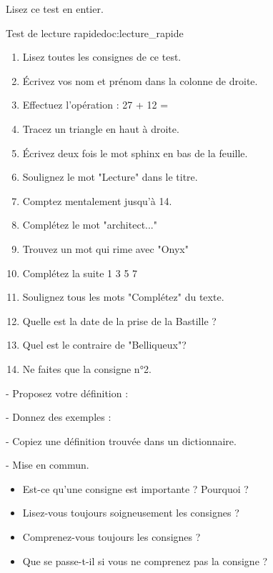 \vAligne{-60pt}

\numeroQuestion Lisez ce test en entier.

\begin{doc}{Test de lecture rapide}{doc:lecture_rapide}
  \begin{enumerate}
    \item Lisez toutes les consignes de ce test.
    \item Écrivez vos nom et prénom dans la colonne de droite.
    \item Effectuez l'opération : 27 + 12 =
    \item Tracez un triangle en haut à droite.
    \item Écrivez deux fois le mot sphinx en bas de la feuille.
    \item Soulignez le mot "Lecture" dans le titre.
    \item Comptez mentalement jusqu'à 14.
    \item Complétez le mot "architect..."
    \item Trouvez un mot qui rime avec "Onyx"
    \item Complétez la suite 1 3 5 7
    \item Soulignez tous les mots "Complétez" du texte.
    \item Quelle est la date de la prise de la Bastille ?
    \item Quel est le contraire de "Belliqueux"?
    \item Ne faites que la consigne n°2.
  \end{enumerate}
\end{doc}


- Proposez votre définition :

- Donnez des exemples :

- Copiez une définition trouvée dans un dictionnaire.

- Mise en commun.

\begin{itemize}
  \item Est-ce qu'une consigne est importante ? Pourquoi ?
  \item Lisez-vous toujours soigneusement les consignes ?
  \item Comprenez-vous toujours les consignes ?
  \item Que se passe-t-il si vous ne comprenez pas la consigne ?
\end{itemize}

